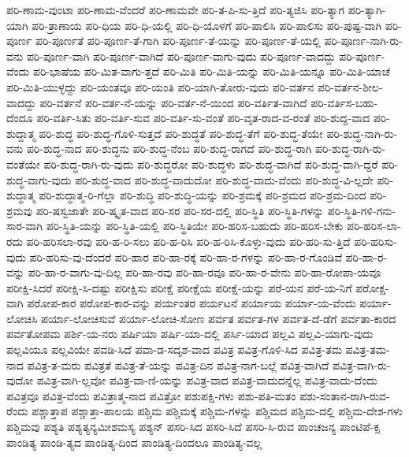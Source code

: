 {ಪರಿ-ಣಾಮ-ವುಂಟಾ
ಪರಿ-ಣಾಮ-ವೆಂದರೆ
ಪರಿ-ಣಾಮವೇ
ಪರಿ-ತ-ಪಿ-ಸು-ತ್ತಿದೆ
ಪರಿ-ತ್ಯಜಿಸಿ
ಪರಿ-ತ್ಯಾಗ
ಪರಿ-ತ್ಯಾಗಿ-ಯಾಗಿ
ಪರಿ-ತ್ರಾಣಾಯ
ಪರಿ-ಧಿಯ
ಪರಿ-ಧಿ-ಯಲ್ಲಿ
ಪರಿ-ಧಿ-ಯೊಳಗೆ
ಪರಿ-ಪಾಲಿಸಿ
ಪರಿ-ಪಾಲಿಸು
ಪರಿ-ಪುಷ್ಟ-ವಾಗಿ
ಪರಿ-ಪೂರ್ಣ
ಪರಿ-ಪೂರ್ಣತೆ
ಪರಿ-ಪೂರ್ಣ-ತೆ-ಗಾಗಿ
ಪರಿ-ಪೂರ್ಣ-ತೆ-ಯನ್ನು
ಪರಿ-ಪೂರ್ಣ-ತೆ-ಯಲ್ಲಿ
ಪರಿ-ಪೂರ್ಣ-ನಾಗಿ-ರು-ವನು
ಪರಿ-ಪೂರ್ಣ-ವಾಗಿ
ಪರಿ-ಪೂರ್ಣ-ವಾಗಿದೆ
ಪರಿ-ಪೂರ್ಣ-ವಾಗು-ವುದು
ಪರಿ-ಪೂರ್ಣ-ವಾದದ್ದು
ಪರಿ-ಪೂರ್ಣ-ವೆಂದು
ಪರಿ-ಭಾಷೆಯ
ಪರಿ-ಮಿತ-ವಾಗು-ತ್ತದೆ
ಪರಿ-ಮಿತಿ
ಪರಿ-ಮಿತಿ-ಯನ್ನು
ಪರಿ-ಮಿತಿ-ಯನ್ನೂ
ಪರಿ-ಮಿತಿ-ಯಾಚೆ
ಪರಿ-ಮಿತಿ-ಯುಳ್ಳದ್ದು
ಪರಿ-ಯಂತವೂ
ಪರಿ-ಯಂತಿ
ಪರಿ-ಯಾಗಿ-ತೋರು-ವುದು
ಪರಿ-ವರ್ತನ
ಪರಿ-ವರ್ತನ-ಶೀಲ-ವಾದದ್ದು
ಪರಿ-ವರ್ತನೆ
ಪರಿ-ವರ್ತ-ನೆ-ಯನ್ನು
ಪರಿ-ವರ್ತ-ನೆ-ಯಿಂದ
ಪರಿ-ವರ್ತಿತ-ವಾಗಿದೆ
ಪರಿ-ವರ್ತಿಸ-ಬಹು-ದೆಂದೂ
ಪರಿ-ವರ್ತಿ-ಸಿತು
ಪರಿ-ವರ್ತಿ-ಸುವ
ಪರಿ-ವರ್ತಿ-ಸು-ವಂತೆ
ಪರಿ-ವೃತ-ರಾದ-ವ-ರಂತೆ
ಪರಿ-ಶುದ್ದ-ವಾದ
ಪರಿ-ಶುದ್ದಾತ್ಮ
ಪರಿ-ಶುದ್ಧ
ಪರಿ-ಶುದ್ಧ-ಗೊಳಿ-ಸುತ್ತದೆ
ಪರಿ-ಶುದ್ಧತೆ
ಪರಿ-ಶುದ್ಧ-ತೆಗೆ
ಪರಿ-ಶುದ್ಧ-ತೆಯೇ
ಪರಿ-ಶುದ್ಧ-ನಾಗಿ-ರು-ವನು
ಪರಿ-ಶುದ್ಧ-ನಾದ
ಪರಿ-ಶುದ್ಧನು
ಪರಿ-ಶುದ್ಧ-ನೆಂಬ
ಪರಿ-ಶುದ್ಧ-ರಾಗದೆ
ಪರಿ-ಶುದ್ಧ-ರಾಗಿ
ಪರಿ-ಶುದ್ಧ-ರಾಗಿ-ರು-ವಂತೆಯೇ
ಪರಿ-ಶುದ್ಧ-ರಾಗಿ-ರು-ವುದು
ಪರಿ-ಶುದ್ಧರೋ
ಪರಿ-ಶುದ್ಧಳು
ಪರಿ-ಶುದ್ಧ-ವಾಗಿದೆ
ಪರಿ-ಶುದ್ಧ-ವಾಗಿ-ದ್ದರೆ
ಪರಿ-ಶುದ್ಧ-ವಾಗು-ವುದು
ಪರಿ-ಶುದ್ಧ-ವಾದ
ಪರಿ-ಶುದ್ಧ-ವಾದುದೋ
ಪರಿ-ಶುದ್ಧ-ವಾದು-ವೆಂದು
ಪರಿ-ಶುದ್ಧ-ವಿ-ಲ್ಲದೇ
ಪರಿ-ಶುದ್ಧಾತ್ಮ
ಪರಿ-ಶುದ್ಧಾತ್ಮ-ರಿ-ಗೆಲ್ಲಾ
ಪರಿ-ಶುದ್ಧಿ
ಪರಿ-ಶುದ್ಧಿ-ಯನ್ನು
ಪರಿ-ಶ್ರಮಕ್ಕೆ
ಪರಿ-ಶ್ರಮದ
ಪರಿ-ಶ್ರಮ-ದಿಂದ
ಪರಿ-ಶ್ರಮವು
ಪರಿ-ಷಸ್ವಜಾತೇ
ಪರಿ-ಷ್ಕೃತ-ವಾದ
ಪರಿ-ಸರ
ಪರಿ-ಸರ-ದಲ್ಲಿ
ಪರಿ-ಸ್ಥಿತಿ
ಪರಿ-ಸ್ಥಿತಿ-ಗಳನ್ನು
ಪರಿ-ಸ್ಥಿತಿ-ಗಳಿ-ಗನು-ಸಾರ-ವಾಗಿ
ಪರಿ-ಸ್ಥಿತಿ-ಯನ್ನು
ಪರಿ-ಸ್ಥಿತಿ-ಯಲ್ಲಿ
ಪರಿ-ಸ್ಥಿತಿಯೇ
ಪರಿ-ಹರಿಸ-ಬಹುದು
ಪರಿ-ಹರಿಸ-ಬೇಕು
ಪರಿ-ಹರಿಸ-ಲಾ-ರದು
ಪರಿ-ಹರಿಸಲಾ-ರವು
ಪರಿ-ಹ-ರಿ-ಸಲು
ಪರಿ-ಹ-ರಿಸಿ
ಪರಿ-ಹ-ರಿಸಿ-ಕೊಳ್ಳು-ವುದು
ಪರಿ-ಹರಿ-ಸು-ತ್ತಿದೆ
ಪರಿ-ಹರಿಸು-ವುದು
ಪರಿ-ಹರಿಸು-ವು-ದೆಂದರೆ
ಪರಿ-ಹಾರ
ಪರಿ-ಹಾ-ರಕ್ಕೆ
ಪರಿ-ಹಾ-ರ-ಗಳನ್ನು
ಪರಿ-ಹಾ-ರ-ಗೊಂಡಿವೆ
ಪರಿ-ಹಾ-ರ-ವನ್ನು
ಪರಿ-ಹಾ-ರ-ವಾಗು-ವು-ದಿಲ್ಲ
ಪರಿ-ಹಾ-ರವು
ಪರಿ-ಹಾ-ರವೂ
ಪರಿ-ಹಾ-ರ-ವೇನು
ಪರಿ-ಹಾ-ರೋಪಾ-ಯವೂ
ಪರೀಕ್ಷಿ-ಸಿದರೆ
ಪರೀಕ್ಷಿ-ಸಿ-ದಷ್ಟು
ಪರೀಕ್ಷಿಸು
ಪರೀಕ್ಷೆ
ಪರೀಕ್ಷೆಯ
ಪರೀಕ್ಷೆ-ಯನ್ನು
ಪರೆ-ಯನ
ಪರೆ-ಯ-ನಿಗೆ
ಪರೋಕ್ಷ-ವಾಗಿ
ಪರೋಪ-ಕಾರ
ಪರೋಪ-ಕಾರ-ವನ್ನು
ಪರ್ಯಂತರ
ಪರ್ಯಟನೆ
ಪರ್ಯಾಯ
ಪರ್ಯಾ-ಯ-ವೆಂದು
ಪರ್ಯಾ-ಲೋಚಿಸಿ
ಪರ್ಯಾ-ಲೋಚಿಸುವೆ
ಪರ್ಯಾ-ಲೋಚಿ-ಸೋಣ
ಪರ್ವತ
ಪರ್ವತ-ಗಳ
ಪರ್ವತ-ದೆ-ಡೆಗೆ
ಪರ್ವತಾ-ಕಾರದ
ಪರ್ವತೋಪಮ
ಪರ್ಶಿ-ಯ-ನರು
ಪರ್ಷಿಯಾ
ಪರ್ಷಿ-ಯಾ-ದಲ್ಲಿ
ಪರ್ಸಿ-ಯಾದ
ಪಲ್ಲವಿ
ಪಲ್ಲವಿ-ಯಾಗು-ವುದು
ಪಲ್ಲವಿಯೂ
ಪಲ್ಲವಿಯೇ
ಪವಡಿ-ಸಿದೆ
ಪವಾ-ಡ-ಸದೃಶ-ವಾದ
ಪವಿತ್ರ
ಪವಿತ್ರ-ಗೊಳಿ-ಸಿದ
ಪವಿತ್ರ-ತಮ
ಪವಿತ್ರ-ತಮ-ನಾದ
ಪವಿತ್ರ-ತ-ಮರು
ಪವಿತ್ರತೆ
ಪವಿತ್ರ-ತೆ-ಯನ್ನು
ಪವಿತ್ರ-ದಿನ
ಪವಿತ್ರ-ನಾಗ-ಬಲ್ಲೆ
ಪವಿತ್ರ-ವಾಗಿದೆ
ಪವಿತ್ರ-ವಾಗಿ-ರು-ವುದೋ
ಪವಿತ್ರ-ವಾಗಿ-ಲ್ಲವೋ
ಪವಿತ್ರ-ವಾ-ಣಿ-ಯನ್ನು
ಪವಿತ್ರ-ವಾದ
ಪವಿತ್ರ-ವಾದುದನ್ನೆಲ್ಲ
ಪವಿತ್ರ-ವಾದು-ದೆಂದು
ಪವಿತ್ರವೂ
ಪವಿತ್ರ-ವೆಂದು
ಪವಿತ್ರಾತ್ಮ-ನಾದ
ಪವಿತ್ರೋ
ಪಶುಪಕ್ಷಿ-ಗಳು
ಪಶು-ಪತಿ-ಮತಂ
ಪಶು-ಸಂತಾನ-ರಾಗಿ-ರುವ-ರೆಂದು
ಪಶ್ಚಾತ್ತಾಪ
ಪಶ್ಚಾತ್ತಾ-ಪಾಲಯ
ಪಶ್ಚಿಮ
ಪಶ್ಚಿಮಕ್ಕೆ
ಪಶ್ಚಿಮ-ಗಳನ್ನು
ಪಶ್ಚಿಮದ
ಪಶ್ಚಿಮ-ದಲ್ಲಿ
ಪಶ್ಚಿಮ-ದೇಶ-ಗಳು
ಪಶ್ಚಿಮವು
ಪಶ್ಯತಿ
ಪಶ್ಯತ್ಯನ್ಯಮೀಶಮಸ್ಯ
ಪಶ್ಯನ್
ಪಸರಿ-ಸಿದ
ಪಸರಿ-ಸಿದೆ
ಪಸರಿ-ಸಿ-ರುವ
ಪಾಂಚಜನ್ಯ
ಪಾಂಟಿಪೆ-ಕ್ಸ
ಪಾಂಡಿತ್ಯ
ಪಾಂಡಿ-ತ್ಯದ
ಪಾಂಡಿತ್ಯ-ದಿಂದ
ಪಾಂಡಿತ್ಯ-ದಿಂದಲೂ
ಪಾಂಡಿತ್ಯ-ವಲ್ಲ
}
